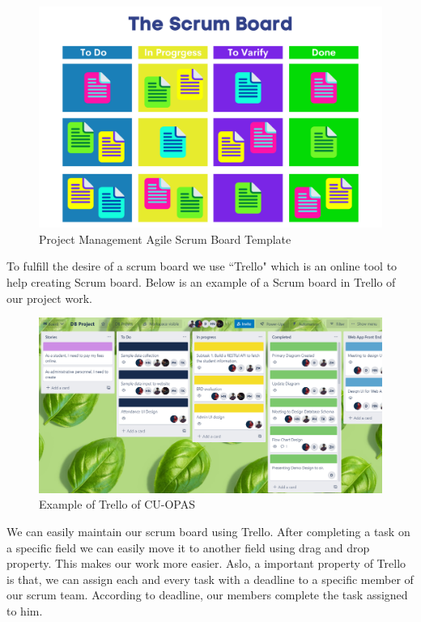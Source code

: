 \begin{enumerate}
\begin{figure}[H]
    \centering
    \includegraphics[width=1\textwidth]{images/scrum_board}
    \caption{Project Management Agile Scrum Board Template}
    \label{fig:scrum_board}
\end{figure}


To fulfill the desire of a scrum board we use ``Trello" which is an online tool to help creating Scrum board. Below is an example of a Scrum board in Trello of our project work.

\begin{figure}[H]
    \centering
    \includegraphics[width=1\textwidth]{images/trello}
    \caption{Example of Trello of CU-OPAS}
    \label{fig:trello}
\end{figure}

We can easily maintain our scrum board using Trello. After completing a task on a specific field we can easily move it to another field using drag and drop property. This makes our work more easier. Aslo, a important property of Trello is that, we can assign each and every task with a deadline to a specific member of our scrum team. According to deadline, our members complete the task assigned to him.



\end{enumerate}
